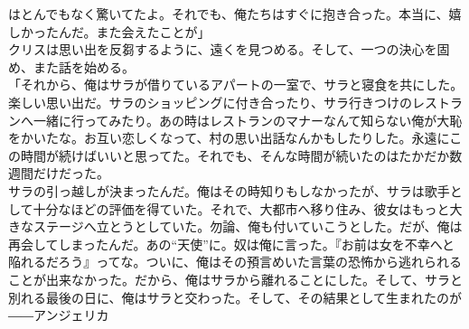 \documentclass[b5j,10pt,openany]{jsbook}
\begin{document}
はとんでもなく驚いてたよ。それでも、俺たちはすぐに抱き合った。本当に、嬉しかったんだ。また会えたことが」\\クリスは思い出を反芻するように、遠くを見つめる。そして、一つの決心を固め、また話を始める。\\「それから、俺はサラが借りているアパートの一室で、サラと寝食を共にした。楽しい思い出だ。サラのショッピングに付き合ったり、サラ行きつけのレストランへ一緒に行ってみたり。あの時はレストランのマナーなんて知らない俺が大恥をかいたな。お互い恋しくなって、村の思い出話なんかもしたりした。永遠にこの時間が続けばいいと思ってた。それでも、そんな時間が続いたのはたかだか数週間だけだった。\\サラの引っ越しが決まったんだ。俺はその時知りもしなかったが、サラは歌手として十分なほどの評価を得ていた。それで、大都市へ移り住み、彼女はもっと大きなステージへ立とうとしていた。勿論、俺も付いていこうとした。だが、俺は再会してしまったんだ。あの``天使''に。奴は俺に言った。『お前は女を不幸へと陥れるだろう』ってな。ついに、俺はその預言めいた言葉の恐怖から逃れられることが出来なかった。だから、俺はサラから離れることにした。そして、サラと別れる最後の日に、俺はサラと交わった。そして、その結果として生まれたのが――アンジェリカ
\end{document}
